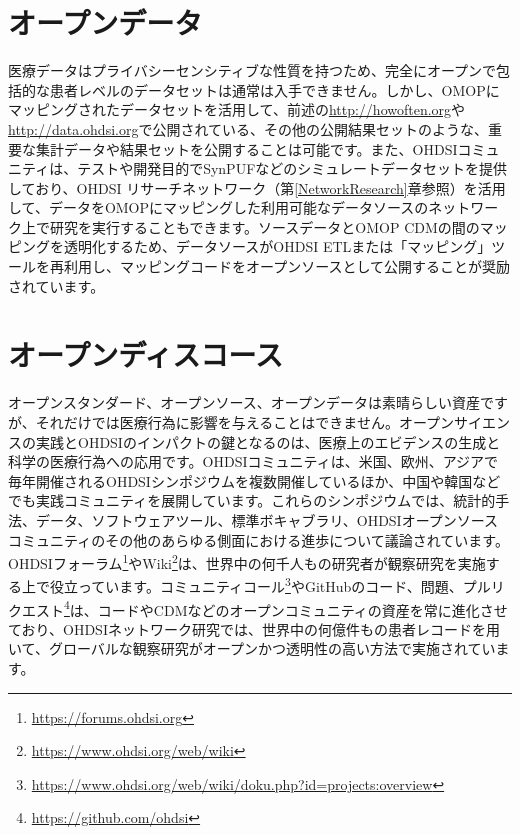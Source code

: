 \documentclass[
  11pt]{book}
\theoremstyle{definition}
\theoremstyle{definition}
\theoremstyle{definition}
\theoremstyle{definition}
\theoremstyle{remark}
\begin{document}
\section{オープンデータ}\label{ux30aaux30fcux30d7ux30f3ux30c7ux30fcux30bf}


医療データはプライバシーセンシティブな性質を持つため、完全にオープンで包括的な患者レベルのデータセットは通常は入手できません。しかし、OMOPにマッピングされたデータセットを活用して、前述の\url{http://howoften.org}や\url{http://data.ohdsi.org}で公開されている、その他の公開結果セットのような、重要な集計データや結果セットを公開することは可能です。また、OHDSIコミュニティは、テストや開発目的でSynPUFなどのシミュレートデータセットを提供しており、OHDSI リサーチネットワーク（第\ref{NetworkResearch}章参照）を活用して、データをOMOPにマッピングした利用可能なデータソースのネットワーク上で研究を実行することもできます。ソースデータとOMOP CDMの間のマッピングを透明化するため、データソースがOHDSI ETLまたは「マッピング」ツールを再利用し、マッピングコードをオープンソースとして公開することが奨励されています。

\section{オープンディスコース}\label{ux30aaux30fcux30d7ux30f3ux30c7ux30a3ux30b9ux30b3ux30fcux30b9}


オープンスタンダード、オープンソース、オープンデータは素晴らしい資産ですが、それだけでは医療行為に影響を与えることはできません。オープンサイエンスの実践とOHDSIのインパクトの鍵となるのは、医療上のエビデンスの生成と科学の医療行為への応用です。OHDSIコミュニティは、米国、欧州、アジアで毎年開催されるOHDSIシンポジウムを複数開催しているほか、中国や韓国などでも実践コミュニティを展開しています。これらのシンポジウムでは、統計的手法、データ、ソフトウェアツール、標準ボキャブラリ、OHDSIオープンソースコミュニティのその他のあらゆる側面における進歩について議論されています。OHDSIフォーラム\footnote{\url{https://forums.ohdsi.org}}やWiki\footnote{\url{https://www.ohdsi.org/web/wiki}}は、世界中の何千人もの研究者が観察研究を実施する上で役立っています。コミュニティコール\footnote{\url{https://www.ohdsi.org/web/wiki/doku.php?id=projects:overview}}やGitHubのコード、問題、プルリクエスト\footnote{\url{https://github.com/ohdsi}}は、コードやCDMなどのオープンコミュニティの資産を常に進化させており、OHDSIネットワーク研究では、世界中の何億件もの患者レコードを用いて、グローバルな観察研究がオープンかつ透明性の高い方法で実施されています。
\end{document}
